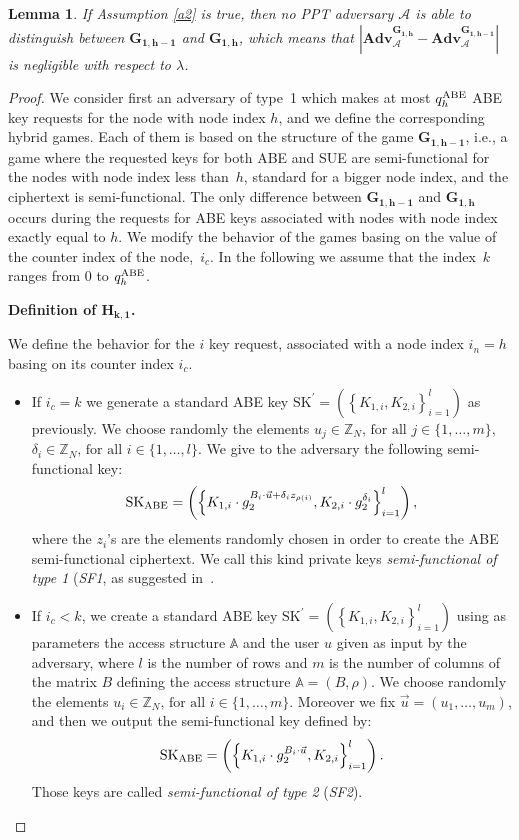 \documentclass[a4paper,10pt]{article}
\newtheorem{lemma}{Lemma}
\newcommand{\Z}{\mathbb{Z}}
\newcommand{\adv}{\textbf{Adv}}
\newcommand{\ith}{\text{-th}}
\newcommand{\varRow}{l}
\newcommand{\varColumn}{m}
\newcommand{\randomchoose}[1]{We choose randomly the element\ifstrequal{#1}{s}{}{s} }
\newcommand{\game}[2]{$\mathbf{#1_{#2}}$}
\newcommand{\mathgame}[2]{\mathbf{#1_{#2}}}
\newcommand{\gamedef}[3]{
\textbf{Definition of \game{#1}{#2}.}
#3}
\newcommand{\sfone}{SF1}
\newcommand{\sftwo}{SF2}
\newcommand{\typeone}{type~1}
\begin{document}
	\begin{lemma}
		\label{lemma.g1h}
		If Assumption \ref{a2} is true, then no PPT adversary $\mathcal{A}$ is able to distinguish between \game{G}{1,h-1} and \game{G}{1,h}, which means that $\left| \adv_{\mathcal{A}}^{\mathgame{G}{1,h}} - \adv_{\mathcal{A}}^{\mathgame{G}{1,h-1}}\right|$ is negligible with respect to $\lambda$.
	\end{lemma}
	\begin{proof}
		We consider first an adversary of \typeone{} which makes at most $q_{h}^\textnormal{ABE}$ ABE key requests for the node with node index $h$, and we define the corresponding hybrid games. Each of them is based on the structure of the game \game{G}{1,h-1}, i.e., a game where the requested keys for both ABE and SUE are semi-functional for the nodes with node index less than~$h$, standard for a bigger node index, and the ciphertext is semi-functional. The only difference between \game{G}{1,h-1} and \game{G}{1,h} occurs during the requests for ABE keys associated with nodes with node index exactly equal to $h$. We modify the behavior of the games basing on the value of the counter index of the node,~$i_c$. In the following we assume that the index~$k$ ranges from $0$ to $q_{h}^\textnormal{ABE}$.
		
		\gamedef{H}{k,1}{
		We define the behavior for the $i$\ith{} key request, associated with a node index $i_n=h$ basing on its counter index $i_c$.
		
		\begin{itemize}
			\item
			If $i_c=k$ we generate a standard ABE key $\mathrm{SK}^\prime=(\left\{K_{1,i},\allowbreak K_{2,i}\right\}_{i=1}^\varRow )$ as previously.
			\randomchoose{p}{$u_j\in\Z_N\text{, for all }j\in \{1,\ldots,\varColumn\}$,
				$\delta_i\in\Z_N\text{, for all }i\in \{1,\ldots,\varRow\}$.
			}
			We give to the adversary the following semi-functional key:
			\[
				\mathrm{SK}_\textnormal{ABE}=\left( \left\{K_{1,i}\cdot g_2^{B_i \cdot \vec{u}+\delta_i z_{\rho(i)}}, K_{2,i}\cdot g_2^{\delta_i}\right\}_{i=1}^\varRow \right),
			\]
			where the $z_i$'s are the elements randomly chosen in order to create the ABE semi-functional ciphertext.
			We call this kind private keys \emph{semi-functional of type 1} (\emph{\sfone}, as suggested in~\cite{lewko2010ABE}.
			
			\item
			If $i_c<k$, we create a standard ABE key $\mathrm{SK}^\prime=(\left\{K_{1,i},\allowbreak K_{2,i}\right\}_{i=1}^\varRow )$ using as parameters the access structure $\mathbb{A}$ and the user $u$ given as input by the adversary, where $\varRow$ is the number of rows and $\varColumn$ is the number of columns of the matrix $B$ defining the access structure $\mathbb{A}=(B,\rho)$.
			\randomchoose{p}{$u_i\in\Z_N\text{, for all }i\in \{1,\ldots,\varColumn\}$.
			}
			Moreover we fix $\vec{u}=(u_1,\ldots,u_\varColumn)$, and then we output the semi-functional key defined by:
			\[
				\mathrm{SK}_\textnormal{ABE}=\left( \left\{K_{1,i}\cdot g_2^{B_i \cdot \vec{u}},K_{2,i}\right\}_{i=1}^\varRow \right).
			\]
			Those keys are called \emph{semi-functional of type 2} (\emph{\sftwo}).
			

\end{itemize}}
\end{proof}
\end{document}
